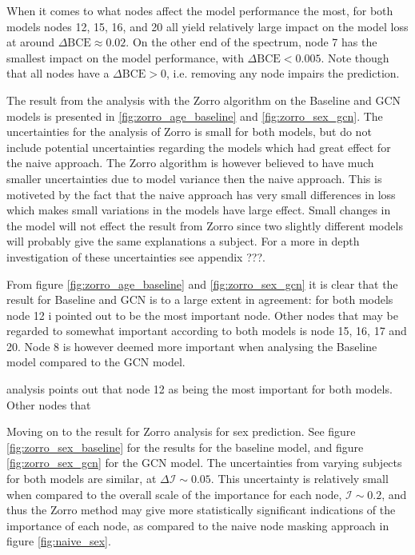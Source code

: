 When it comes to what nodes affect the model performance the most, for both models nodes 12, 15, 16, and 20 all yield relatively large impact on the model loss at around $\Delta \text{BCE} \approx 0.02$. On the other end of the spectrum, node 7 has the smallest impact on the model performance, with $\Delta \text{BCE} < 0.005$. Note though that all nodes have a $\Delta\text{BCE}>0$, i.e. removing any node impairs the prediction.


The result from the analysis with the Zorro algorithm on the Baseline and GCN models is presented in \ref{fig:zorro_age_baseline} and \ref{fig:zorro_sex_gcn}. The uncertainties for the analysis of Zorro is small for both models, but do not include potential uncertainties regarding the models which had great effect for the naive approach. The Zorro algorithm is however believed to have much smaller uncertainties due to model variance then the naive approach. This is motiveted by the fact that the naive approach has very small differences in loss which makes small variations in the models have large effect. Small changes in the model will not effect the result from Zorro since two slightly different models will probably give the same explanations a subject. For a more in depth investigation of these uncertainties see appendix ???. 

From figure \ref{fig:zorro_age_baseline} and \ref{fig:zorro_sex_gcn} it is clear that the result for Baseline and GCN is to a large extent in agreement: for both models node 12 i pointed out to be the most important node. Other nodes that may be regarded to somewhat important according to both models is node 15, 16, 17 and 20. Node 8 is however deemed more important when analysing the Baseline model compared to the GCN model. 


analysis points out that node 12 as being the most important for both models. Other nodes that 




Moving on to the result for Zorro analysis for sex prediction. See figure \ref{fig:zorro_sex_baseline} for the results for the baseline model, and figure \ref{fig:zorro_sex_gcn} for the GCN model. The uncertainties from varying subjects for both models are similar, at $\Delta \mathcal{I} \sim 0.05$. This uncertainty is relatively small when compared to the overall scale of the importance for each node, $\mathcal{I} \sim 0.2$, and thus the Zorro method may give more statistically significant indications of the importance of each node, as compared to the naive node masking approach in figure \ref{fig:naive_sex}.


